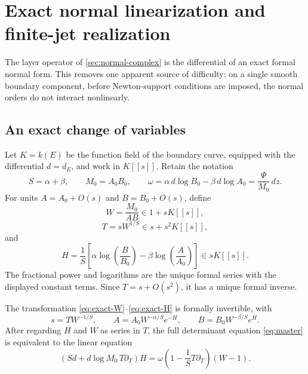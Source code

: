 \section{Exact normal linearization and finite-jet realization}
\label{app:exact-normal-linearization}

The layer operator of \cref{sec:normal-complex} is the differential of an
exact formal normal form.  This removes one apparent source of difficulty:
on a single smooth boundary component, before Newton-support conditions are
imposed, the normal orders do not interact nonlinearly.

\subsection{An exact change of variables}

Let \(K=k(E)\) be the function field of the boundary curve, equipped with
the differential \(d=d_E\), and work in \(K[[s]]\).  Retain the notation
\[
S=\alpha+\beta,\qquad M_0=A_0B_0,
\qquad
\omega=\alpha\,d\log B_0-\beta\,d\log A_0
       =\frac{\Psi}{M_0}\,dz.
\]
For units \(A=A_0+O(s)\) and \(B=B_0+O(s)\), define
\begin{equation}
\label{eq:exact-W}
W=\frac{M_0}{AB}\in1+sK[[s]],
\end{equation}
\begin{equation}
\label{eq:exact-T}
T=sW^{1/S}\in s+s^2K[[s]],
\end{equation}
and
\begin{equation}
\label{eq:exact-H}
H=\frac1S\left[
\alpha\log\left(\frac{B}{B_0}\right)
-\beta\log\left(\frac{A}{A_0}\right)
\right]\in sK[[s]].
\end{equation}
The fractional power and logarithms are the unique formal series with the
displayed constant terms.  Since \(T=s+O(s^2)\), it has a unique formal
inverse.

\begin{theorem}
\label{thm:exact-normal-linearization}
The transformation
\eqref{eq:exact-W}--\eqref{eq:exact-H} is formally invertible, with
\begin{equation}
\label{eq:exact-inverse}
s=TW^{-1/S},\qquad
A=A_0W^{-\alpha/S}e^{-H},\qquad
B=B_0W^{-\beta/S}e^H.
\end{equation}
After regarding \(H\) and \(W\) as series in \(T\), the full determinant
equation \eqref{eq:master} is equivalent to the linear equation
\begin{equation}
\label{eq:exact-linear-equation}
\boxed{
\left(Sd+d\log M_0\,T\partial_T\right)H
=
\omega\left(1-\frac1S T\partial_T\right)(W-1).}
\end{equation}
\end{theorem}

